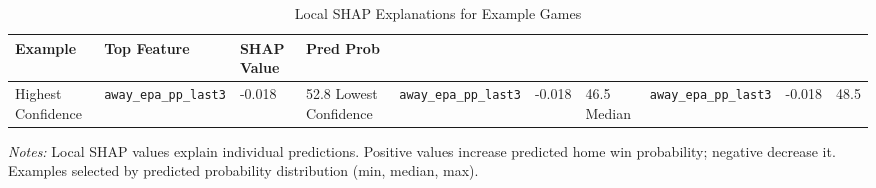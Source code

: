 \begin{table}[htbp]
\centering
\caption{Local SHAP Explanations for Example Games}
\label{tab:shap-local-examples}
\begin{threeparttable}
\begin{tabularx}{\linewidth}{@{}lYYY@{}}
\toprule
Example & Top Feature & SHAP Value & Pred Prob \\
\midrule
Highest Confidence & \texttt{away\_epa\_pp\_last3} & -0.018 & 52.8%
Lowest Confidence & \texttt{away\_epa\_pp\_last3} & -0.018 & 46.5%
Median & \texttt{away\_epa\_pp\_last3} & -0.018 & 48.5%
\bottomrule
\end{tabularx}
\begin{tablenotes}[flushleft]
\footnotesize
\item \textit{Notes:} Local SHAP values explain individual predictions. Positive values increase predicted home win probability; negative decrease it. Examples selected by predicted probability distribution (min, median, max).
\end{tablenotes}
\end{threeparttable}
\end{table}

